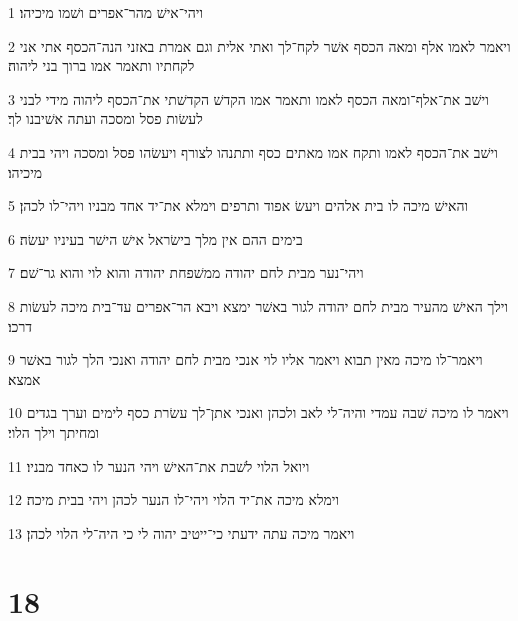 \par 1 ויהי־אישׁ מהר־אפרים ושׁמו מיכיהו׃
\par 2 ויאמר לאמו אלף ומאה הכסף אשׁר לקח־לך ואתי אלית וגם אמרת באזני הנה־הכסף אתי אני לקחתיו ותאמר אמו ברוך בני ליהוה׃
\par 3 וישׁב את־אלף־ומאה הכסף לאמו ותאמר אמו הקדשׁ הקדשׁתי את־הכסף ליהוה מידי לבני לעשׂות פסל ומסכה ועתה אשׁיבנו לך׃
\par 4 וישׁב את־הכסף לאמו ותקח אמו מאתים כסף ותתנהו לצורף ויעשׂהו פסל ומסכה ויהי בבית מיכיהו׃
\par 5 והאישׁ מיכה לו בית אלהים ויעשׂ אפוד ותרפים וימלא את־יד אחד מבניו ויהי־לו לכהן׃
\par 6 בימים ההם אין מלך בישׂראל אישׁ הישׁר בעיניו יעשׂה׃
\par 7 ויהי־נער מבית לחם יהודה ממשׁפחת יהודה והוא לוי והוא גר־שׁם׃
\par 8 וילך האישׁ מהעיר מבית לחם יהודה לגור באשׁר ימצא ויבא הר־אפרים עד־בית מיכה לעשׂות דרכו׃
\par 9 ויאמר־לו מיכה מאין תבוא ויאמר אליו לוי אנכי מבית לחם יהודה ואנכי הלך לגור באשׁר אמצא׃
\par 10 ויאמר לו מיכה שׁבה עמדי והיה־לי לאב ולכהן ואנכי אתן־לך עשׂרת כסף לימים וערך בגדים ומחיתך וילך הלוי׃
\par 11 ויואל הלוי לשׁבת את־האישׁ ויהי הנער לו כאחד מבניו׃
\par 12 וימלא מיכה את־יד הלוי ויהי־לו הנער לכהן ויהי בבית מיכה׃
\par 13 ויאמר מיכה עתה ידעתי כי־ייטיב יהוה לי כי היה־לי הלוי לכהן׃

\chapter{18}

